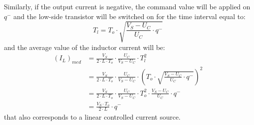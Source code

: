Similarly, if the output current is negative, the command value will be applied on $q^-$ and the low-side transistor will be switched on for the time interval equal to:
\begin{equation}
    T_l = T_o \cdot \sqrt{\frac{V_S - U_C}{U_C} \cdot q^-}
\end{equation}
and the average value of the inductor current will be:
\begin{equation}
    \begin{split}
        (I_L)_{med} &= \frac{V_S}{2 \cdot L \cdot T_o} \cdot \frac{U_C}{V_S - U_C} \cdot T_l^2 \\
        &= \frac{V_S}{2 \cdot L \cdot T_o} \cdot \frac{U_C}{V_S - U_C} \cdot \left(T_o \cdot \sqrt{\frac{V_S - U_C}{U_C} \cdot q^-}\right)^2 \\
        &= \frac{V_S}{2 \cdot L \cdot T_o} \cdot \frac{U_C}{V_S - U_C} \cdot T_o^2 \cdot \frac{V_S - U_C}{U_C} \cdot q^- \\
        &= \frac{V_S \cdot T_o}{2 \cdot L} \cdot q^-
    \end{split}
\end{equation}
that also corresponds to a linear controlled current source.

